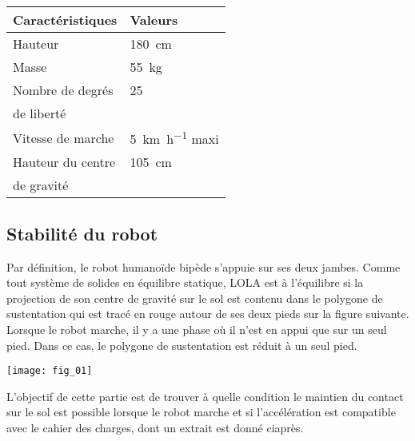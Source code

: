\begin{marginfigure}
\footnotesize
\centering
\begin{tabular}{ll}
\hline
\textbf{Caractéristiques} & \textbf{Valeurs} \\
\hline
Hauteur & \SI{180}{cm} \\
Masse & \SI{55}{kg} \\
Nombre de degrés  & 25 \\
de liberté & \\
Vitesse de marche & \SI{5}{km.h^{-1}} maxi \\ 
Hauteur du centre & \SI{105}{cm} \\
de gravité  & \\
\hline
\end{tabular}
\normalsize

\end{marginfigure}

\fi

\subsection*{Stabilité du robot}
\ifprof
\else

Par définition, le robot humanoïde bipède s'appuie sur ses deux jambes.
Comme tout système de solides en équilibre statique, LOLA est à l’équilibre si
la projection de son centre de gravité sur le sol est contenu dans le polygone
de sustentation qui est tracé en rouge autour de ses deux pieds sur la figure suivante.
Lorsque le robot marche, il y a une phase où il n'est en appui que sur un seul
pied. Dans ce cas, le polygone de sustentation est réduit à un seul pied.


\begin{marginfigure}
\centering
\texttt{[image: fig\_01]}
\end{marginfigure}
\fi
\begin{obj}
L’objectif de cette partie est de trouver à quelle condition le maintien du contact sur le sol est possible lorsque
le robot marche et si l'accélération est compatible avec le cahier des charges, dont un extrait est donné ciaprès.
\end{obj}



